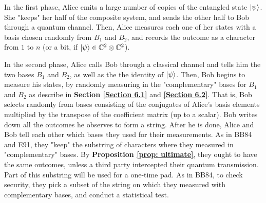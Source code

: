 In the first phase, Alice emits a large number of copies of the entangled state $\ket{\psi}$.  She "keeps" her half of the composite system, and sends the other half to Bob through a quantum channel.  Then, Alice measures each one of her states with a basis chosen randomly from $B_1$ and $B_2$, and records the outcome as a character from $1$ to $n$ (or a bit, if $\ket{\psi}\in {\mathbb{C}}^2 \otimes {\mathbb{C}}^2$).  



In the second phase, Alice calls Bob through a classical channel and tells him the two bases $B_1$ and $B_2$, as well as the the identity of $\ket{\psi}$.  Then, Bob begins to measure his states, by randomly measuring in the "complementary" bases for $B_1$ and $B_2$ as describe in {\bf{Section} \ref{Section 6.1}} and \textbf{\ref{Section 6.2}}.  That is, Bob selects randomly from bases consisting of the conjugates of Alice's basis elements multiplied by the transpose of the coefficient matrix (up to a scalar).  Bob writes down all the outcomes he observes to form a string.  After he is done, Alice and Bob tell each other which bases they used for their measurements.  As in BB84 and E91, they "keep" the substring of characters where they measured in "complementary" bases.  By {\bf{Proposition} \ref{prop: ultimate}}, they ought to have the same outcomes, unless a third party intercepted their quantum transmission.  Part of this substring will be used for a one-time pad.  As in BB84, to check security, they pick a subset of the string on which they measured with complementary bases, and conduct a statistical test.


